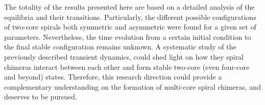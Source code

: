 The totality of the results presented here are based on a detailed analysis of the equilibria
and their transitions. Particularly, the different possible configurations of two-core spirals
both symmetric and asymmetric were found for a given set of parameters. Nevertheless,
the time evolution from a certain initial condition to the final stable configuration remains
unknown. A systematic study of the previously described transient dynamics, could shed light on how they spiral
chimeras interact between each other and form stable two-core (even four-core and beyond)
states. Therefore, this research direction could provide a complementary understanding on
the formation of multi-core spiral chimeras, and deserves to be pursued.